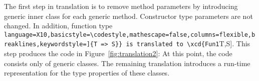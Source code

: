 \documentclass{llncs}
\newcommand\codestyle\tt
\newcommand{\xcd}[1]{{\lstinline[language=X10,basicstyle=\codestyle,mathescape=false,columns=flexible,breaklines,keywordstyle=]{#1}}}
\newcommand{\xcd}[1]{{\tt #1}}
\begin{document}
\begin{figure*}[tp]
\caption{After removing method parameters}
\label{fig:translation2}
\end{figure*}

The first step in translation is to remove method parameters by
introducing generic inner class for each generic method.
Constructor type parameters are not changed.
In addition, function type \xcd{T => S} is translated to \xcd{Fun1[T,S]}.
This step produces the code in Figure~\ref{fig:translation2}:
At this point, the code consists only of generic classes.
The remaining translation introduces a run-time representation
for the type properties of these classes.
\end{document}
